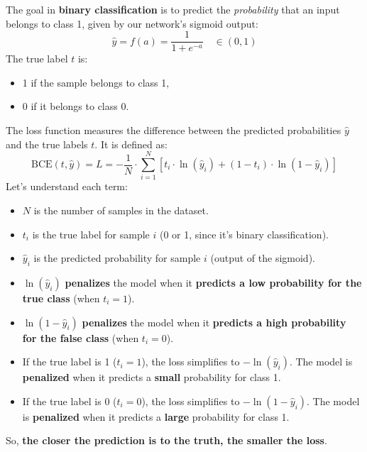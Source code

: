 \highspace
\begin{deepeningbox}
    The goal in \textbf{binary classification} is to predict the \emph{probability} that an input belongs to class 1, given by our network's sigmoid output:
    \begin{equation*}
        \hat{y} = f(a) = \dfrac{1}{1 + e^{-a}} \quad \in (0, 1)
    \end{equation*}
    The true label $t$ is:
    \begin{itemize}
        \item 1 if the sample belongs to class 1,
        \item 0 if it belongs to class 0.
    \end{itemize}
    The  loss function measures the difference between the predicted probabilities $\hat{y}$ and the true labels $t$. It is defined as:
    \begin{equation}
        \text{BCE}\left(t, \hat{y}\right) = L = - \dfrac{1}{N} \cdot \displaystyle\sum_{i=1}^{N} \left[
            t_i \cdot \ln\left(\hat{y}_i\right) + \left(1 - t_i\right) \cdot \ln\left(1 - \hat{y}_i\right)
        \right]
    \end{equation}
    Let's understand each term:
    \begin{itemize}
        \item $N$ is the number of samples in the dataset.
        \item $t_i$ is the true label for sample $i$ (0 or 1, since it's binary classification).
        \item $\hat{y}_i$ is the predicted probability for sample $i$ (output of the sigmoid).
        \item $\ln\left(\hat{y}_i\right)$ \textbf{penalizes} the model when it \textbf{predicts a low probability for the true class} (when $t_i = 1$).
        \item $\ln\left(1 - \hat{y}_i\right)$ \textbf{penalizes} the model when it \textbf{predicts a high probability for the false class} (when $t_i = 0$).
        \item If the true label is 1 ($t_i = 1$), the loss simplifies to $- \ln\left(\hat{y}_i\right)$. The model is \textbf{penalized} when it predicts a \textbf{small} probability for class 1.
        \item If the true label is 0 ($t_i = 0$), the loss simplifies to $- \ln\left(1 - \hat{y}_i\right)$. The model is \textbf{penalized} when it predicts a \textbf{large} probability for class 1.
    \end{itemize}
    So, \textbf{the closer the prediction is to the truth, the smaller the loss}.


\end{deepeningbox}

